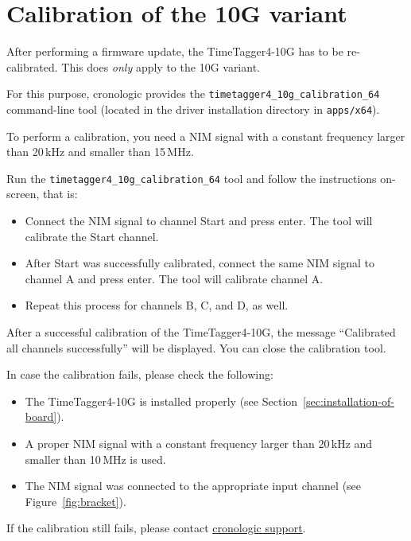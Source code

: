\section{Calibration of the 10G variant}

After performing a firmware update, the TimeTagger4-10G has to be re-calibrated.
This does \emph{only} apply to the 10G variant.

For this purpose, cronologic provides the \texttt{timetagger4\_10g\_calibration\_64} command-line tool (located in the driver installation directory in 
\texttt{apps/x64}).

To perform a calibration, you need a NIM signal with a constant frequency larger than 20\,kHz and smaller than 15\,MHz.

Run the \texttt{timetagger4\_10g\_calibration\_64} tool and follow the instructions on-screen, that is:

\begin{itemize}
    \item Connect the NIM signal to channel Start and press enter. The tool will calibrate the Start channel.
    \item After Start was successfully calibrated, connect the same NIM signal to channel A and press enter. The tool will calibrate channel A.
    \item Repeat this process for channels B, C, and D, as well.
\end{itemize}

After a successful calibration of the TimeTagger4-10G, the message ``Calibrated all channels successfully'' will be displayed.
You can close the calibration tool.

In case the calibration fails, please check the following:
\begin{itemize}
    \item The TimeTagger4-10G is installed properly (see Section~\ref{sec:installation-of-board}).
    \item A proper NIM signal with a constant frequency larger than 20\,kHz and smaller than 10\,MHz is used.
    \item The NIM signal was connected to the appropriate input channel (see Figure~\ref{fig:bracket}).
\end{itemize}

If the calibration still fails, please contact \href{https://www.cronologic.de/contact}{cronologic support}.